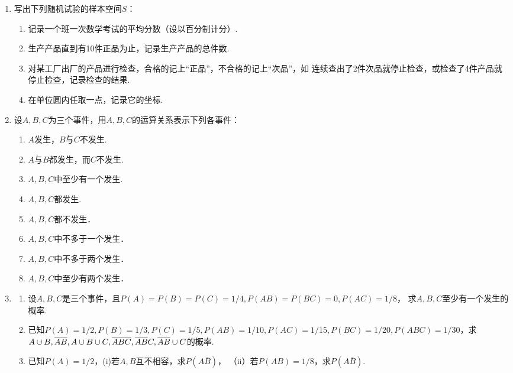 \documentclass[10pt,a4paper]{article}
\begin{document}
\begin{enumerate}
    
    \item 写出下列随机试验的样本空间$S$：
    \begin{enumerate}
        \item 记录一个班一次数学考试的平均分数（设以百分制计分）.
        \item 生产产品直到有10件正品为止，记录生产产品的总件数.
        \item 对某工厂出厂的产品进行检查，合格的记上“正品”，不合格的记上“次品”，如
        连续查出了2件次品就停止检查，或检查了4件产品就停止检查，记录检查的结果.
        \item 在单位圆内任取一点，记录它的坐标.
    \end{enumerate}


    \item 设$A,B,C$为三个事件，用$A,B,C$的运算关系表示下列各事件：
    \begin{enumerate}
        \item $A$发生，$B$与$C$不发生.
        \item $A$与$B$都发生，而$C$不发生.
        \item $A,B,C$中至少有一个发生.
        \item $A,B,C$都发生.
        \item $A,B,C$都不发生．
        \item $A,B,C$中不多于一个发生．
        \item $A,B,C$中不多于两个发生．
        \item $A,B,C$中至少有两个发生．
    \end{enumerate}


    \item \begin{enumerate}
        \item 设$A,B,C$是三个事件，且$P(A)=P(B)=P(C)=1/4,P(AB)=P(BC)=0,P(AC)=1/8$，
        求$A,B,C$至少有一个发生的概率.
        \item 已知$P(A)=1/2,P(B)=1/3,P(C)=1/5,P(AB)=1/10,P(AC)=1/15,P(BC)=1/20,P(ABC)=1/30$，求
        $A\cup B,\overline{A} \overline{B},A\cup B\cup C,\overline{A}\overline{B}\overline{C},\\\overline{A}\overline{B}C,\overline{A}\overline{B}\cup C$的概率.
        \item 已知$P(A)=1/2$，(i)若$A,B$互不相容，求$P(A\overline{B})$，
        （ii）若$P(AB)=1/8$，求$P(A\overline{B})$.
    \end{enumerate}



\end{enumerate}
\end{document}
